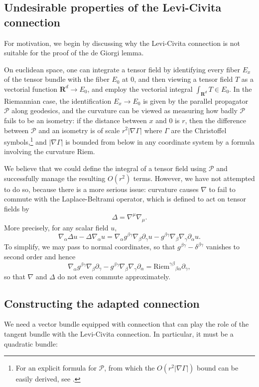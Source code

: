 \documentclass[reqno,12pt,letterpaper]{amsart}
\newcommand{\RR}{\mathbf{R}}
\newcommand{\Riem}{\mathrm{Riem}}
\theoremstyle{definition}
\numberwithin{equation}{section}
\begin{document}
\subsection{Undesirable properties of the Levi-Civita connection}
For motivation, we begin by discussing why the Levi-Civita connection is not suitable for the proof of the de Giorgi lemma.

On euclidean space, one can integrate a tensor field by identifying every fiber $E_x$ of the tensor bundle with the fiber $E_0$ at $0$, and then viewing a tensor field $T$ as a vectorial function $\RR^d \to E_0$, and employ the vectorial integral $\int_{\RR^d} T \in E_0$.
In the Riemannian case, the identification $E_x \to E_0$ is given by the parallel propagator $\mathcal P$ along geodesics, and the curvature can be viewed as measuring how badly $\mathcal P$ fails to be an isometry: if the distance between $x$ and $0$ is $r$, then the difference between $\mathcal P$ and an isometry is of scale $r^2 |\nabla \Gamma|$ where $\Gamma$ are the Christoffel symbols,\footnote{For an explicit formula for $\mathcal P$, from which the $O(r^2 |\nabla \Gamma|)$ bound can be easily derived, see \cite[Chapter II.2]{baez1994gauge}.} 
and $|\nabla \Gamma|$ is bounded from below in any coordinate system by a formula involving the curvature $\Riem$.

We believe that we could define the integral of a tensor field using $\mathcal P$ and successfully manage the resulting $O(r^2)$ terms.
However, we have not attempted to do so, because there is a more serious issue: curvature causes $\nabla$ to fail to commute with the Laplace-Beltrami operator, which is defined to act on tensor fields by
$$\Delta = \nabla^\mu \nabla_\mu.$$
More precisely, for any scalar field $u$,
$$\nabla_\alpha \Delta u - \Delta \nabla_\alpha u = \nabla_\alpha g^{\beta \gamma} \nabla_\beta \partial_\gamma u - g^{\beta \gamma} \nabla_\beta \nabla_\gamma \partial_\alpha u.$$
To simplify, we may pass to normal coordinates, so that $g^{\beta \gamma} - \delta^{\beta \gamma}$ vanishes to second order and hence
$$\nabla_\alpha g^{\beta \gamma} \nabla_\beta \partial_\gamma - g^{\beta \gamma} \nabla_\beta \nabla_\gamma \partial_\alpha = {\Riem^{\gamma \beta}}_{\beta \alpha} \partial_\gamma,$$
so that $\nabla$ and $\Delta$ do not even commute approximately.

\subsection{Constructing the adapted connection}
We need a vector bundle equipped with connection that can play the role of the tangent bundle with the Levi-Civita connection.
In particular, it must be a quadratic bundle:
\end{document}
